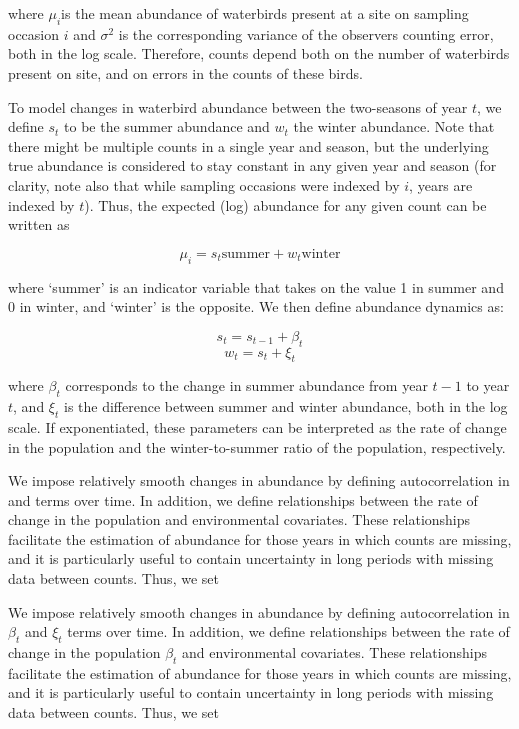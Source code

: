 \documentclass[utf8]{frontiersSCNS}
\begin{document}
where \(\mu_i\)is the mean abundance of waterbirds present at a site on
sampling occasion \(i\) and \(\sigma^2\) is the corresponding variance
of the observers counting error, both in the log scale. Therefore,
counts depend both on the number of waterbirds present on site, and on
errors in the counts of these birds.

To model changes in waterbird abundance between the two-seasons of year
\(t\), we define \(s_t\) to be the summer abundance and \(w_t\) the
winter abundance. Note that there might be multiple counts in a single
year and season, but the underlying true abundance is considered to stay
constant in any given year and season (for clarity, note also that while
sampling occasions were indexed by \(i\), years are indexed by \(t\)).
Thus, the expected (log) abundance for any given count can be written as

\[\mu_{i} = s_t \textrm{summer} + w_t \textrm{winter}\]

where `summer' is an indicator variable that takes on the value 1 in
summer and 0 in winter, and `winter' is the opposite. We then define
abundance dynamics as:

\[s_t = s_{t-1} + \beta_t\] \[w_t = s_t + \xi_t\]

where \(\beta_t\) corresponds to the change in summer abundance from
year \(t-1\) to year \(t\), and \(\xi_t\) is the difference between
summer and winter abundance, both in the log scale. If exponentiated,
these parameters can be interpreted as the rate of change in the
population and the winter-to-summer ratio of the population,
respectively.

We impose relatively smooth changes in abundance by defining
autocorrelation in and terms over time. In addition, we define
relationships between the rate of change in the population and
environmental covariates. These relationships facilitate the estimation
of abundance for those years in which counts are missing, and it is
particularly useful to contain uncertainty in long periods with missing
data between counts. Thus, we set

We impose relatively smooth changes in abundance by defining
autocorrelation in \(\beta_t\) and \(\xi_t\) terms over time. In
addition, we define relationships between the rate of change in the
population \(\beta_t\) and environmental covariates. These relationships
facilitate the estimation of abundance for those years in which counts
are missing, and it is particularly useful to contain uncertainty in
long periods with missing data between counts. Thus, we set
\end{document}

